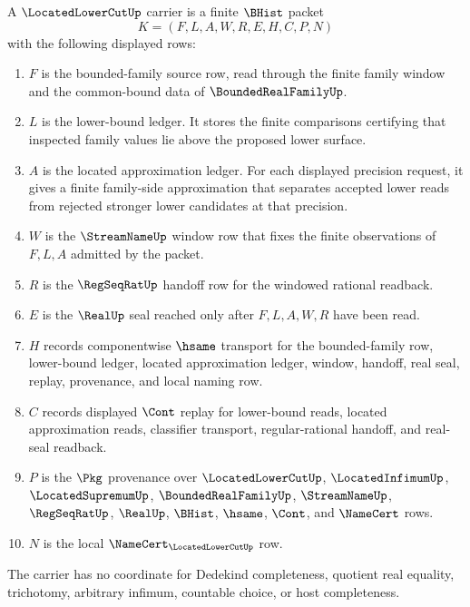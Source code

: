 \begin{definition}
\label{def:located-lower-cut-carrier}
A $\LocatedLowerCutUp$ carrier is a finite $\BHist$ packet
$$
K=(F,L,A,W,R,E,H,C,P,N)
$$
with the following displayed rows:
\begin{enumerate}
\item $F$ is the bounded-family source row, read through the finite family window and the common-bound data of $\BoundedRealFamilyUp$.
\item $L$ is the lower-bound ledger. It stores the finite comparisons certifying that inspected family values lie above the proposed lower surface.
\item $A$ is the located approximation ledger. For each displayed precision request, it gives a finite family-side approximation that separates accepted lower reads from rejected stronger lower candidates at that precision.
\item $W$ is the $\StreamNameUp$ window row that fixes the finite observations of $F,L,A$ admitted by the packet.
\item $R$ is the $\RegSeqRatUp$ handoff row for the windowed rational readback.
\item $E$ is the $\RealUp$ seal reached only after $F,L,A,W,R$ have been read.
\item $H$ records componentwise $\hsame$ transport for the bounded-family row, lower-bound ledger, located approximation ledger, window, handoff, real seal, replay, provenance, and local naming row.
\item $C$ records displayed $\Cont$ replay for lower-bound reads, located approximation reads, classifier transport, regular-rational handoff, and real-seal readback.
\item $P$ is the $\Pkg$ provenance over $\LocatedLowerCutUp$, $\LocatedInfimumUp$, $\LocatedSupremumUp$, $\BoundedRealFamilyUp$, $\StreamNameUp$, $\RegSeqRatUp$, $\RealUp$, $\BHist$, $\hsame$, $\Cont$, and $\NameCert$ rows.
\item $N$ is the local $\NameCert_{\LocatedLowerCutUp}$ row.
\end{enumerate}
The carrier has no coordinate for Dedekind completeness, quotient real equality, trichotomy, arbitrary infimum, countable choice, or host completeness.
\end{definition}

